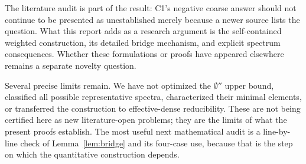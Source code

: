 \documentclass[11pt,a4paper]{article}
\theoremstyle{definition}
\theoremstyle{remark}
\begin{document}
The literature audit is part of the result: C1's negative coarse answer should not continue to be presented as unestablished merely because a newer source lists the question. What this report adds as a research argument is the self-contained weighted construction, its detailed bridge mechanism, and explicit spectrum consequences. Whether these formulations or proofs have appeared elsewhere remains a separate novelty question.

Several precise limits remain. We have not optimized the $\emptyset''$ upper bound, classified all possible representative spectra, characterized their minimal elements, or transferred the construction to effective-dense reducibility. These are not being certified here as new literature-open problems; they are the limits of what the present proofs establish. The most useful next mathematical audit is a line-by-line check of Lemma~\ref{lem:bridge} and its four-case use, because that is the step on which the quantitative construction depends.

\appendix
\end{document}
